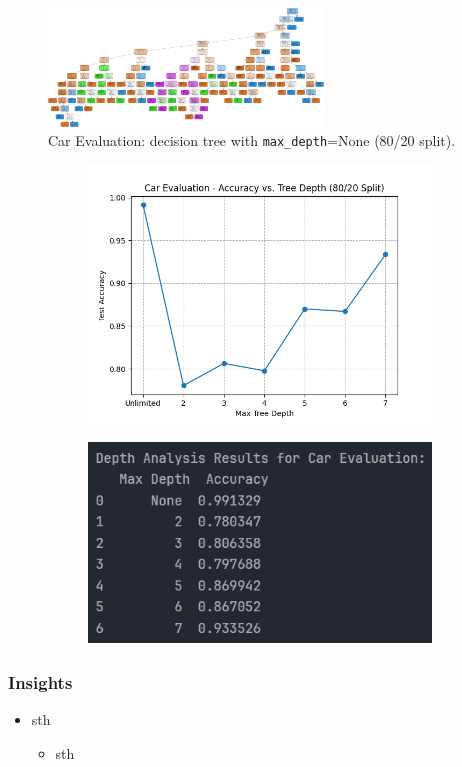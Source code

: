 \begin{figure}[H]
	\centering
	\includegraphics[width=0.65\textwidth]{imgs/dt-mini/dt__car_evaluation__80_vs_20__None.png}
	\caption{Car Evaluation: decision tree with \texttt{max\_depth}=None (80/20 split).}\label{fig:ce-dt-depth-none}
\end{figure}

\begin{figure}[H]
	\centering
	\begin{subfigure}{0.45\textwidth}
		\centering
		\includegraphics[width=\textwidth]{imgs/accuracy_vs_depth_car_evaluation.png}
	\end{subfigure}
	\hfill
	\begin{subfigure}{0.45\textwidth}
		\centering
		\includegraphics[width=\textwidth]{imgs/accuracy_vs_depth_car_evaluation__analysis.png}
	\end{subfigure}
\end{figure}

\subsubsection*{Insights}
\begin{itemize}
	\item sth
	      \begin{itemize}
		      \item sth
	      \end{itemize}
\end{itemize}
